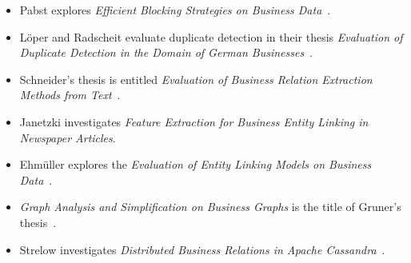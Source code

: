 \begin{itemize}
\itemsep-0.1cm
\item Pabst explores \emph{Efficient Blocking Strategies on Business Data}~\cite{pabst}.
\item Löper and Radscheit evaluate duplicate detection in their thesis \emph{Evaluation of Duplicate Detection in the Domain of German Businesses}~\cite{loeperradscheit}.
\item Schneider's thesis is entitled \emph{Evaluation of Business Relation Extraction Methods from Text}~\cite{schneider}.
\item Janetzki investigates \emph{Feature Extraction for Business Entity Linking in Newspaper Articles}.
\item Ehmüller explores the \emph{Evaluation of Entity Linking Models on Business Data}~\cite{ehmueller}.
\item \emph{Graph Analysis and Simplification on Business Graphs} is the title of Gruner's thesis~\cite{gruner}.
\item Strelow investigates \emph{Distributed Business Relations in Apache Cassandra}~\cite{strelow}.
\end{itemize}